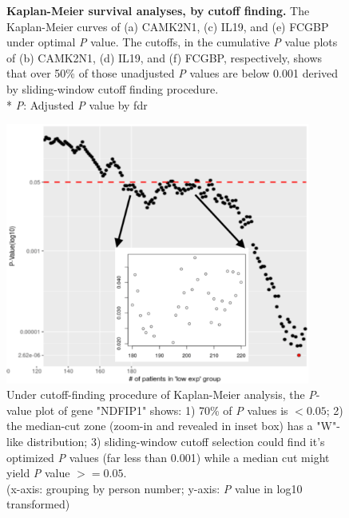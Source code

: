 \documentclass[preprint,12pt]{elsarticle}
\newcommand{\bcaption}[2]{\caption{\textbf{#1} #2}}
\newenvironment{MyColorPar}[1]{%
    \leavevmode\color{#1}\ignorespaces%
}{%
}%
\begin{document}
\begin{MyColorPar}{blue}
\begin{figure}[ht]
\bcaption{Kaplan-Meier survival analyses, by cutoff finding.}
{The Kaplan-Meier curves of (a) CAMK2N1, (c) IL19, and (e) FCGBP under optimal \textit{P} value. 
The cutoffs, in the cumulative \textit{P} value plots of (b) CAMK2N1, (d) IL19, and (f) FCGBP, respectively,
shows that over 50\% of those unadjusted \textit{P} values are below 0.001 derived by sliding-window cutoff finding procedure.\\
* \textit{P}: Adjusted \textit{P} value by \acrfull{fdr}
}
\label{fig:figure4}
\end{figure}






\begin{figure}[ht]
    \centering
    \includegraphics[width=10cm]{Rplot_pvaluePlot_NDFIP1.pdf}
    \caption{Under cutoff-finding procedure of Kaplan-Meier analysis, the \textit{P}-value plot of gene "NDFIP1" shows: 1) 70\% of \textit{P} values is $<0.05$; 2) the median-cut zone (zoom-in and revealed in inset box) has a "W"-like distribution; 3) sliding-window cutoff selection could find it's optimized \textit{P} values (far less than 0.001) while a median cut might yield \textit{P} value $>=0.05$.\\
    (x-axis: grouping by person number; y-axis: \textit{P} value in log10 transformed)}
    \label{fig:pvaluePlot_NDFIP1}
\end{figure}


\end{MyColorPar}
\end{document}
